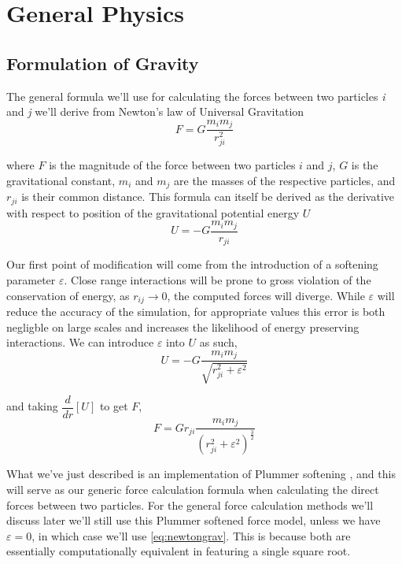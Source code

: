 \documentclass[12pt, twoside, letterpaper]{article}
\begin{document}
\section{General Physics} \label{sec:phys}
\subsection{Formulation of Gravity} \label{subsec:gravity}
The general formula we'll use for calculating the forces between two particles \textit{i} and \textit{j} we'll derive from Newton's law of Universal Gravitation
\begin{equation} \label{eq:newtongrav}
F = G \dfrac{m_im_j}{r_{ji}^2}
\end{equation}

\noindent where $F$ is the magnitude of the force between two particles $i$ and $j$, $G$ is the gravitational constant, $m_i$ and $m_j$ are the masses of the respective particles, and $r_{ji}$ is their common distance.  This formula can itself be derived as the derivative with respect to position of the gravitational potential energy $U$
\begin{equation} \label{eq:newtonpotential}
U = -G \dfrac{m_im_j}{r_{ji}}
\end{equation}

Our first point of modification will come from the introduction of a softening parameter $\varepsilon$. Close range interactions will be prone to gross violation of the conservation of energy, as $r_{ij} \rightarrow 0$, the computed forces will diverge. While $\varepsilon$ will reduce the accuracy of the simulation, for appropriate values this error is both negligble on large scales and increases the likelihood of energy preserving interactions. We can introduce $\varepsilon$ into $U$ as such,
\begin{equation} \label{eq:\theequation}
U = -G \dfrac{m_im_j}{\sqrt{r_{ji}^2 + \varepsilon^2}}
\end{equation}

\noindent and taking $\dfrac{d}{dr}[U]$ to get $F$,
\begin{equation} \label{eq:fmagplum}
F = G r_{ji} \dfrac{m_im_j}{(r_{ji}^2+\varepsilon^2)^\frac{3}{2}}
\end{equation}

What we've just described is an implementation of Plummer softening \citep{dyer1993softening}, and this will serve as our generic force calculation formula when calculating the direct forces between two particles. For the general force calculation methods we'll discuss later we'll still use this Plummer softened force model, unless we have $\varepsilon = 0$, in which case we'll use \eqref{eq:newtongrav}. This is because both are essentially computationally equivalent in featuring a single square root.
\end{document}
